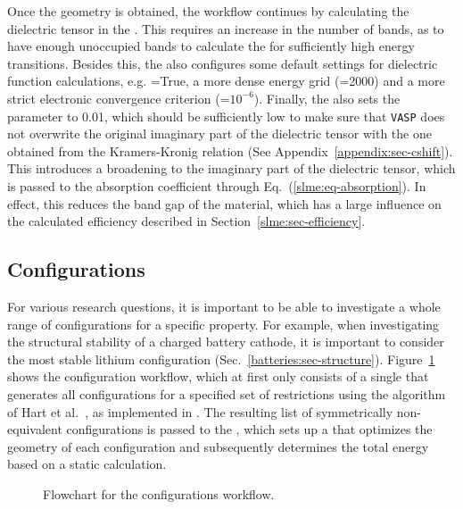 \begin{refsection}
Once the geometry is obtained, the workflow continues by calculating the 
dielectric tensor in the . This requires an increase in the 
number of bands, as to have enough unoccupied bands to calculate the 
 for sufficiently high energy 
transitions. Besides this, the  also configures some default 
settings for dielectric function calculations, e.g. =True, a 
more dense energy grid (=2000) and a more strict electronic 
convergence criterion (=$10^{-6}$). Finally, the  
also sets the  parameter to 0.01, which should be sufficiently low to make sure 
that \texttt{VASP} does not overwrite the original imaginary part of the 
dielectric tensor with the one obtained from the Kramers-Kronig relation (See Appendix~\ref{appendix:sec-cshift}). This 
introduces a broadening to the imaginary part of the dielectric tensor, which 
is passed to the absorption coefficient through 
Eq.~(\ref{slme:eq-absorption}). In effect, this reduces the band gap of the 
material, which has a large influence on the calculated efficiency described 
in Section~\ref{slme:sec-efficiency}. 
 
\subsection{Configurations} \label{automation:sec-configurations} 
 
For various research questions, it is important to be able to investigate a 
whole range of configurations for a specific property. For example, when 
investigating the structural stability of a charged battery cathode, it is 
important to consider the most stable lithium 
configuration (Sec.~\ref{batteries:sec-structure}). 
Figure~\ref{automation:fig-configurations} shows the configuration workflow, 
which at first only consists of a single  that generates all 
configurations for a specified set of restrictions using the algorithm of Hart 
et al.~\cite{Hart2005}, as implemented in 
. The 
resulting list of symmetrically non-equivalent configurations is passed to the 
, which sets up a 
 that optimizes the geometry of each configuration and 
subsequently determines the total energy based on a static calculation. 
 
\begin{figure}[ht] 
\centering 
 
\caption{\label{automation:fig-configurations} Flowchart for the 
configurations workflow.} 
\end{figure} 
 

\end{refsection}
